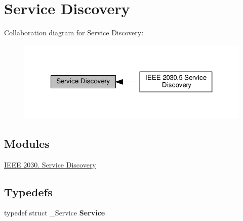 \hypertarget{group__dnssd__client}{}\section{Service Discovery}
\label{group__dnssd__client}
Collaboration diagram for Service Discovery\+:\nopagebreak
\begin{figure}[H]
\begin{center}
\leavevmode
\includegraphics[width=321pt]{group__dnssd__client}
\end{center}
\end{figure}
\subsection*{Modules}
\begin{DoxyCompactItemize}
\item 
\hyperlink{group__se__discover}{I\+E\+E\+E 2030. Service Discovery}
\end{DoxyCompactItemize}
\subsection*{Typedefs}
\begin{DoxyCompactItemize}
\item 
\mbox{\label{group__dnssd__client_gaabd3019c43122eb4e319dfd53571b524}} 
typedef struct \+\_\+\+Service {\bfseries Service}
\end{DoxyCompactItemize}
